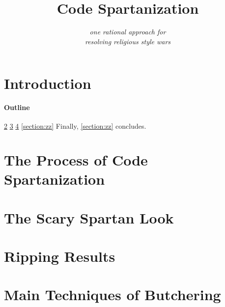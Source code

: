 \documentclass[preprint,10pt,nonatbib]{sigplanconf}
\title{Code Spartanization}
\subtitle{\scriptsize \emph{one rational approach for\\ resolving religious style wars}}
\begin{document}
\maketitle

\def\ignore#1{}
\def\gal{\marginpar[G$\Rightarrow$]{$\Leftarrow$G}}
\def\yossi{\marginpar[Y$\Rightarrow$]{$\Leftarrow$Y}}
\def\matteo{\marginpar[M$\Rightarrow$]{$\Leftarrow$M}}

\begin{abstract}
  
\end{abstract}

\section{Introduction}


\paragraph{Outline}
\cref{section:principia}
\cref{section:look}
\cref{section:initial}
\cref{section:zz}
Finally, \cref{section:zz} concludes.

\section{The Process of Code Spartanization}
\label{section:principia}


\section{The Scary Spartan Look}
\label{section:look}


\section{Ripping Results}
\label{section:initial}


\label{section:zz}


\balance
\small


\appendix
\section{Main Techniques of Butchering}
\label{section:techniques}

\end{document}
